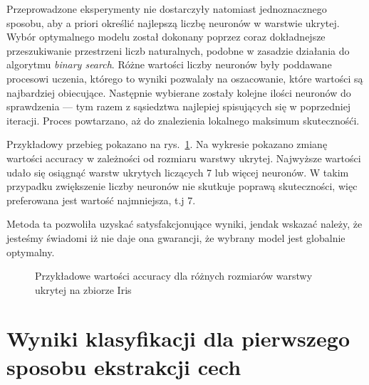 \documentclass[10pt]{article}
\begin{document}
Przeprowadzone eksperymenty nie dostarczyły natomiast jednoznacznego sposobu, aby a priori określić najlepszą liczbę neuronów w warstwie ukrytej.
Wybór optymalnego modelu został dokonany poprzez coraz dokładnejsze przeszukiwanie przestrzeni liczb naturalnych, podobne w zasadzie działania do algorytmu \emph{binary search}.
Różne wartości liczby neuronów były poddawane procesowi uczenia, którego to wyniki pozwalały na oszacowanie, które wartości są najbardziej obiecujące.
Następnie wybierane zostały kolejne ilości neuronów do sprawdzenia --- tym razem z sąsiedztwa najlepiej spisujących się w poprzedniej iteracji.
Proces powtarzano, aż do znalezienia lokalnego maksimum skutecznośći.

Przykładowy przebieg pokazano na rys.~\ref{fig:hidden-size-choice}. Na wykresie pokazano zmianę wartości accuracy w zależności od rozmiaru warstwy ukrytej.
Najwyższe wartości udało się osiągnąć warstw ukrytych liczących 7 lub więcej neuronów. W takim przypadku zwiększenie liczby neuronów nie skutkuje poprawą skuteczności, więc preferowana jest wartość najmniejsza, t.j 7.

Metoda ta pozwoliła uzyskać satysfakcjonujące wyniki, jendak wskazać należy, że jesteśmy świadomi iż nie daje ona gwarancji, że wybrany model jest globalnie optymalny.

\begin{figure}[H]\centering
    \caption{Przykładowe wartości accuracy dla różnych rozmiarów warstwy ukrytej na zbiorze Iris}\label{fig:hidden-size-choice}
\end{figure}

\pagebreak

\section{Wyniki klasyfikacji dla pierwszego sposobu ekstrakcji cech}
\end{document}
